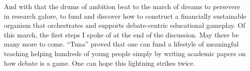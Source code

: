 And with that the drums of ambition beat to the march of dreams to persevere in research galore, to fund and discover how to construct a financially sustainable organism that orchestrates and supports debate-centric educational gameplay. Of this march, the first steps I spoke of at the end of the discussion. May there be many more to come. ``Tuna'' proved that one can fund a lifestyle of meaningful teaching helping hundreds of young people simply by writing academic papers on how debate is a game. One can hope this lightning strikes twice.